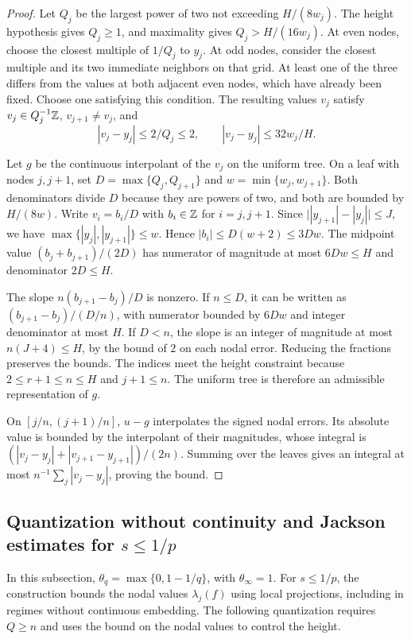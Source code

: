 \documentclass[11pt,a4paper]{article}
\begin{document}
\begin{proof}
Let $Q_j$ be the largest power of two not exceeding $H/(8w_j)$. The height hypothesis gives $Q_j\ge1$, and maximality gives $Q_j>H/(16w_j)$. At even nodes, choose the closest multiple of $1/Q_j$ to $y_j$. At odd nodes, consider the closest multiple and its two immediate neighbors on that grid. At least one of the three differs from the values at both adjacent even nodes, which have already been fixed. Choose one satisfying this condition. The resulting values $v_j$ satisfy $v_j\in Q_j^{-1}\mathbb Z$, $v_{j+1}\ne v_j$, and
\[
 |v_j-y_j|\le 2/Q_j\le2,\qquad |v_j-y_j|\le32w_j/H.
\]

Let $g$ be the continuous interpolant of the $v_j$ on the uniform tree. On a leaf with nodes $j,j+1$, set $D=\max\{Q_j,Q_{j+1}\}$ and $w=\min\{w_j,w_{j+1}\}$. Both denominators divide $D$ because they are powers of two, and both are bounded by $H/(8w)$. Write $v_i=b_i/D$ with $b_i\in\mathbb Z$ for $i=j,j+1$. Since $\bigl||y_{j+1}|-|y_j|\bigr|\le J$, we have $\max\{|y_j|,|y_{j+1}|\}\le w$. Hence $|b_i|\le D(w+2)\le3Dw$. The midpoint value $(b_j+b_{j+1})/(2D)$ has numerator of magnitude at most $6Dw\le H$ and denominator $2D\le H$.

The slope $n(b_{j+1}-b_j)/D$ is nonzero. If $n\le D$, it can be written as $(b_{j+1}-b_j)/(D/n)$, with numerator bounded by $6Dw$ and integer denominator at most $H$. If $D<n$, the slope is an integer of magnitude at most $n(J+4)\le H$, by the bound of $2$ on each nodal error. Reducing the fractions preserves the bounds. The indices meet the height constraint because $2\le r+1\le n\le H$ and $j+1\le n$. The uniform tree is therefore an admissible representation of $g$.

On $[j/n,(j+1)/n]$, $u-g$ interpolates the signed nodal errors. Its absolute value is bounded by the interpolant of their magnitudes, whose integral is $(|v_j-y_j|+|v_{j+1}-y_{j+1}|)/(2n)$. Summing over the leaves gives an integral at most $n^{-1}\sum_j|v_j-y_j|$, proving the bound.
\end{proof}

\subsection{Quantization without continuity and Jackson estimates for \texorpdfstring{$s\le1/p$}{s ≤ 1/p}}

In this subsection, $\theta_q=\max\{0,1-1/q\}$, with $\theta_\infty=1$. For $s\le1/p$, the construction bounds the nodal values $\lambda_j(f)$ using local projections, including in regimes without continuous embedding. The following quantization requires $Q\ge n$ and uses the bound on the nodal values to control the height.
\end{document}
